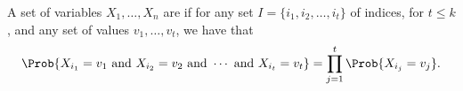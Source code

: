 \begin{defn}
    A set of variables $X_1, \ldots, X_n$ are  if for any set $I = \{i_1, i_2, \ldots, i_t\}$ of
    indices, for $t \leq k$, and any set of values $v_1, \ldots, v_t$,
    we have that
    \begin{equation*}
        \Prob{
           X_{i_1} = v_1 \text{ and }
           X_{i_2} = v_2 \text{ and } \cdots \text{ and }
           X_{i_t} = v_t}%
        =%
        \prod_{j=1}^t        
        \Prob{X_{i_j} = v_j}.
    \end{equation*}
\end{defn}
